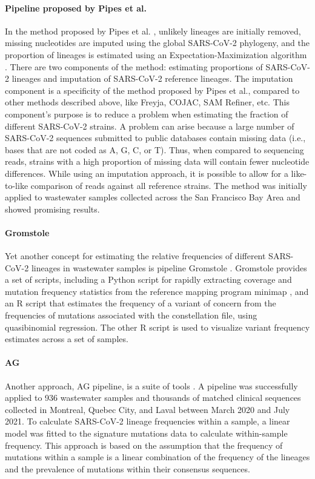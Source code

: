         \paragraph{Pipeline proposed by Pipes et al.}
        In the method proposed by Pipes et al. \cite{pipes2022}, unlikely lineages are initially removed, missing nucleotides are imputed using the global SARS-CoV-2 phylogeny, and the proportion of lineages is estimated using an Expectation-Maximization algorithm \cite{dempster1977}. There are two components of the method: estimating proportions of SARS-CoV-2 lineages and imputation of SARS-CoV-2 reference lineages. The imputation component is a specificity of the method proposed by Pipes et al., compared to other methods described above, like Freyja, COJAC, SAM Refiner, etc. This component's purpose is to reduce a problem when estimating the fraction of different SARS-CoV-2 strains. A problem can arise because a large number of SARS-CoV-2 sequences submitted to public databases contain missing data (i.e., bases that are not coded as A, G, C, or T). Thus, when compared to sequencing reads, strains with a high proportion of missing data will contain fewer nucleotide differences. While using an imputation approach, it is possible to allow for a like-to-like comparison of reads against all reference strains. The method was initially applied to wastewater samples collected across the San Francisco Bay Area and showed promising results.
        \paragraph{Gromstole}
        Yet another concept for estimating the relative frequencies of different SARS-CoV-2 lineages in wastewater samples is pipeline Gromstole \cite{gromstole2022}. Gromstole provides a set of scripts, including a Python script for rapidly extracting coverage and mutation frequency statistics from the reference mapping program minimap \cite{li2018}, and an R script that estimates the frequency of a variant of concern from the frequencies of mutations associated with the constellation file, using quasibinomial regression. The other R script is used to visualize variant frequency estimates across a set of samples.
        \paragraph{AG}
        Another approach, AG pipeline, is a suite of tools \cite{nguessan2022}. A pipeline was successfully applied to 936 wastewater samples and thousands of matched clinical sequences collected in Montreal, Quebec City, and Laval between March 2020 and July 2021. To calculate SARS-CoV-2 lineage frequencies within a sample, a linear model was fitted to the signature mutations data to calculate within-sample frequency. This approach is based on the assumption that the frequency of mutations within a sample is a linear combination of the frequency of the lineages and the prevalence of mutations within their consensus sequences. 

